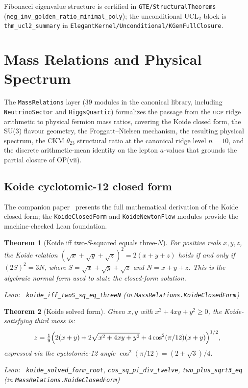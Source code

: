\documentclass[11pt,a4paper]{article}
\newenvironment{leanref}%
  {\par\smallskip\noindent\begingroup\raggedright\textup{Lean:}~}%
  {\par\endgroup}
\newtheorem{theorem}{Theorem}[section]
\theoremstyle{definition}
\newcommand{\ugp}{\textsc{ugp}}
\begin{document}
\noindent
Fibonacci eigenvalue structure is certified in
\texttt{GTE/StructuralTheorems}
(\lstinline|neg_inv_golden_ratio_minimal_poly|);
the unconditional UCL$_2$ block is
\lstinline|thm_ucl2_summary| in \texttt{ElegantKernel/Unconditional/KGenFullClosure}.

\section[Mass Relations]{Mass Relations and Physical Spectrum}\label{sec:massrelations}

The \texttt{MassRelations} layer (39 modules in the canonical library, including
\texttt{NeutrinoSector} and \texttt{HiggsQuartic}) formalizes the
passage from the \ugp{} ridge arithmetic to physical fermion mass
ratios, covering the Koide closed form, the SU(3) flavour geometry,
the Froggatt--Nielsen mechanism, the resulting physical spectrum,
the CKM $\theta_{23}$ structural ratio at the canonical ridge level
$n = 10$, and the discrete arithmetic-mean identity on the lepton
$a$-values that grounds the partial closure of OP(vii).

\subsection{Koide cyclotomic-12 closed form}

The companion paper~\cite{Spivack2026_Koide} presents the full
mathematical derivation of the Koide closed form; the \texttt{KoideClosedForm}
and \texttt{KoideNewtonFlow} modules provide the machine-checked
Lean foundation.

\begin{theorem}[Koide iff two-$S$-squared equals three-$N$]\label{thm:koide-iff}
For positive reals $x, y, z$, the Koide relation
$(\sqrt{x}+\sqrt{y}+\sqrt{z})^2 = 2(x+y+z)$ holds if and only if
$(2S)^2 = 3N$, where $S = \sqrt{x}+\sqrt{y}+\sqrt{z}$ and $N = x+y+z$.
This is the algebraic normal form used to state the closed-form solution.

\begin{leanref} \lstinline|koide_iff_twoS_sq_eq_threeN|
\textup{(in \texttt{MassRelations.KoideClosedForm})}
\end{leanref}
\end{theorem}

\begin{theorem}[Koide solved form]\label{thm:koide-solved}
Given $x, y$ with $x^2 + 4xy + y^2 \ge 0$, the Koide-satisfying
third mass is:
\[
  z = \tfrac{1}{9}\Bigl(2(x+y) + 2\sqrt{x^2+4xy+y^2}
                        + 4\cos^2(\pi/12)(x+y)\Bigr)^{1/2},
\]
expressed via the cyclotomic-12 angle $\cos^2(\pi/12) = (2+\sqrt{3})/4$.

\begin{leanref} \lstinline|koide_solved_form_root|,
\lstinline|cos_sq_pi_div_twelve|,
\lstinline|two_plus_sqrt3_eq|
\textup{(in \texttt{MassRelations.KoideClosedForm})}
\end{leanref}
\end{theorem}
\end{document}
